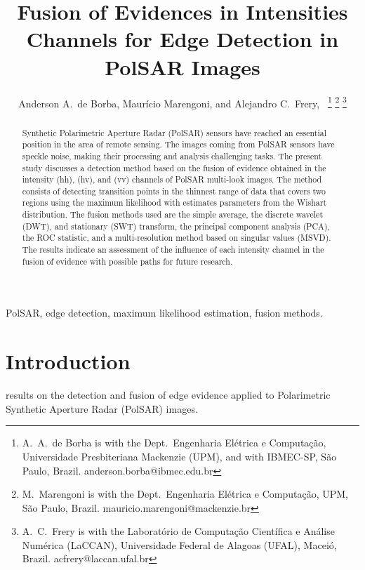 \documentclass[journal]{IEEEtran}
\begin{document}
\title{Fusion of Evidences in Intensities Channels for Edge Detection in PolSAR Images}
\author{Anderson A.\ de Borba, Maurício Marengoni, and Alejandro C.\ Frery,~%
\thanks{A.\ A.\ de Borba is with the Dept.\ Engenharia Elétrica e Computação, Universidade Presbiteriana Mackenzie (UPM), and with IBMEC-SP, São Paulo, Brazil. anderson.borba@ibmec.edu.br}
\thanks{M.\ Marengoni is with the Dept.\ Engenharia Elétrica e Computação,
UPM, São Paulo, Brazil. mauricio.marengoni@mackenzie.br}
\thanks{A.\ C.\ Frery is with the Laboratório de Computação Científica e Análise Numérica (LaCCAN), Universidade Federal de Alagoas (UFAL), Maceió, Brazil. acfrery@laccan.ufal.br}}

\maketitle

\begin{abstract}
Synthetic Polarimetric Aperture Radar (PolSAR) sensors have reached an essential position in the area of remote sensing. 
The images coming from PolSAR sensors have speckle noise, making their processing and analysis challenging tasks. 
The present study discusses a detection method based on the fusion of evidence obtained in the intensity (hh), (hv), and (vv) channels of PolSAR multi-look images. 
The method consists of detecting transition points in the thinnest range of data that covers two regions using the maximum likelihood with estimates parameters from the Wishart distribution. 
The fusion methods used are the simple average, the discrete wavelet (DWT), and stationary (SWT) transform, the principal component analysis (PCA), the ROC statistic, and a multi-resolution method based on singular values (MSVD). 
The results indicate an assessment of the influence of each intensity channel in the fusion of evidence with possible paths for future research.
\end{abstract}

\begin{IEEEkeywords}
PolSAR, edge detection, maximum likelihood estimation, fusion methods. 
\end{IEEEkeywords}

\section{Introduction}\label{sec_01}

results on the detection and fusion of edge evidence applied to Polarimetric Synthetic Aperture Radar (PolSAR) images.
\end{document}
